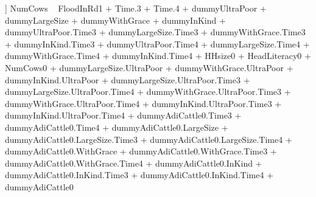 \begin{Schunk}
\begin{Soutput}
[[6]]
NumCows ~ FloodInRd1 + Time.3 + Time.4 + dummyUltraPoor + dummyLargeSize + 
    dummyWithGrace + dummyInKind + dummyUltraPoor.Time3 + dummyLargeSize.Time3 + 
    dummyWithGrace.Time3 + dummyInKind.Time3 + dummyUltraPoor.Time4 + 
    dummyLargeSize.Time4 + dummyWithGrace.Time4 + dummyInKind.Time4 + 
    HHsize0 + HeadLiteracy0 + NumCows0 + dummyLargeSize.UltraPoor + 
    dummyWithGrace.UltraPoor + dummyInKind.UltraPoor + dummyLargeSize.UltraPoor.Time3 + 
    dummyLargeSize.UltraPoor.Time4 + dummyWithGrace.UltraPoor.Time3 + 
    dummyWithGrace.UltraPoor.Time4 + dummyInKind.UltraPoor.Time3 + 
    dummyInKind.UltraPoor.Time4 + dummyAdiCattle0.Time3 + dummyAdiCattle0.Time4 + 
    dummyAdiCattle0.LargeSize + dummyAdiCattle0.LargeSize.Time3 + 
    dummyAdiCattle0.LargeSize.Time4 + dummyAdiCattle0.WithGrace + 
    dummyAdiCattle0.WithGrace.Time3 + dummyAdiCattle0.WithGrace.Time4 + 
    dummyAdiCattle0.InKind + dummyAdiCattle0.InKind.Time3 + dummyAdiCattle0.InKind.Time4 + 
    dummyAdiCattle0
\end{Soutput}
\end{Schunk}
